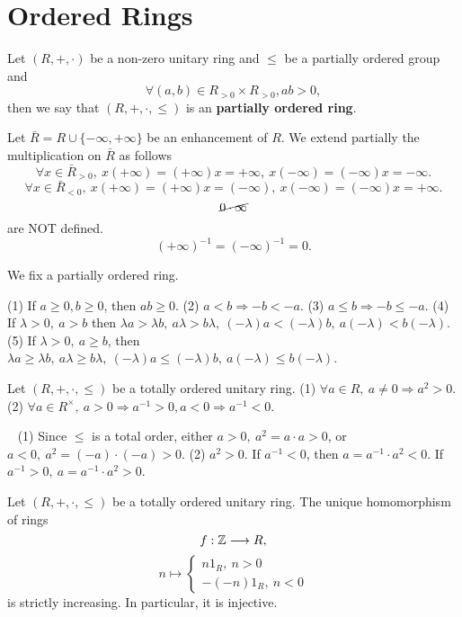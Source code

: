\section{Ordered Rings}
\begin{definitionenv}
    Let $(R,+,\cdot)$ be a non-zero unitary ring and $\le$ be a partially ordered group and 
    $$\forall (a,b)\in R_{>0}\times R_{>0}, ab>0,$$
    then we say that $(R,+,\cdot,\le)$ is an \textbf{partially ordered ring}.

    Let $\bar{R}=R\cup\{-\infty,+\infty\}$ be an enhancement of $R$. We extend partially the multiplication on $\bar{R}$ as follows
    $$\forall x\in \bar{R}_{>0},\  x(+\infty)=(+\infty)x=+\infty,\  x(-\infty)=(-\infty)x=-\infty.$$
    $$\forall x\in \bar{R}_{<0},\  x(+\infty)=(+\infty)x=(-\infty),\  x(-\infty)=(-\infty)x=+\infty.$$
    $$\cancel{0\cdot \infty}$$
    are NOT defined.
    $$(+\infty)^{-1}=(-\infty)^{-1}=0.$$
\end{definitionenv}
We fix a partially ordered ring. 
\begin{box2}
    (1) If $a\ge 0,b\ge 0$, then $ab\ge 0$.
    \newline
    (2) $a<b\Rightarrow -b< -a$.
    \newline
    (3) $a\le b\Rightarrow -b\le -a$.
    \newline
    (4) If $\lambda>0,\ a>b$ then $\lambda a>\lambda b,\ a\lambda>b\lambda,\ (-\lambda )a<(-\lambda)b,\ a(-\lambda)<b(-\lambda)$.
    \newline
    (5) If $\lambda>0, \ a\ge b$, then $\lambda a\ge \lambda b,\ a\lambda\ge b\lambda,\ (-\lambda )a\le (-\lambda)b,\ a(-\lambda)\le b(-\lambda)$.
\end{box2}
\begin{propositionenv}
    Let $(R,+,\cdot,\le)$ be a totally ordered unitary ring. 
    \newline
    (1) $\forall a\in R,\ a\not=0\Rightarrow a^2>0.$
    \newline
    (2) $\forall a\in R^\times,\ a>0\Rightarrow a^{-1}>0, a<0\Rightarrow a^{-1}<0.$ 
\end{propositionenv}
\begin{proofenv}
    \ \newline
    (1) Since $\le$ is a total order, either $a>0,\ a^2=a\cdot a >0$, or $a<0,\ a^2=(-a)\cdot(-a)>0$.
    \newline
    (2) $a^2>0$. If $a^{-1}<0$, then $a=a^{-1}\cdot a^2<0$. If $a^{-1}>0,\ a=a^{-1}\cdot a^2>0$.
\end{proofenv}
\begin{propositionenv}
    Let $(R,+,\cdot,\le)$ be a totally ordered unitary ring. The unique homomorphism of rings
    $$f:\mathbb{Z}\longrightarrow R,$$
    $$n\longmapsto \begin{cases} n 1_R,\ n>0\\ -(-n)1_R,\ n<0\end{cases}$$
    is strictly increasing. In particular, it is injective.
\end{propositionenv}
